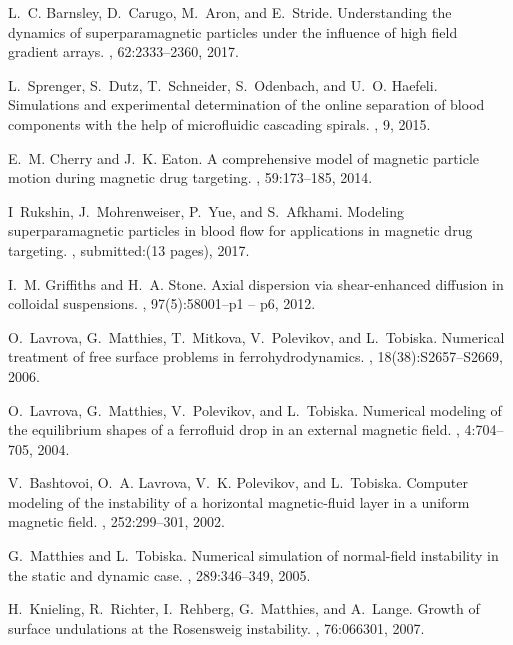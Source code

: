 \begin{thebibliography}{10}
L.~C. Barnsley, D.~Carugo, M.~Aron, and E.~Stride.
\newblock Understanding the dynamics of superparamagnetic particles under the
  influence of high field gradient arrays.
, 62:2333--2360, 2017.

L.~Sprenger, S.~Dutz, T.~Schneider, S.~Odenbach, and U.~O. Haefeli.
\newblock Simulations and experimental determination of the online separation
  of blood components with the help of microfluidic cascading spirals.
, 9, 2015.

E.~M. Cherry and J.~K. Eaton.
\newblock A comprehensive model of magnetic particle motion during magnetic
  drug targeting.
, 59:173--185, 2014.

I~Rukshin, J.~Mohrenweiser, P.~Yue, and S.~Afkhami.
\newblock Modeling superparamagnetic particles in blood flow for applications
  in magnetic drug targeting.
, submitted:(13 pages), 2017.

I.~M. Griffiths and H.~A. Stone.
\newblock Axial dispersion via shear-enhanced diffusion in colloidal
  suspensions.
, 97(5):58001--p1 -- p6, 2012.

O.~Lavrova, G.~Matthies, T.~Mitkova, V.~Polevikov, and L.~Tobiska.
\newblock Numerical treatment of free surface problems in ferrohydrodynamics.
, 18(38):S2657--S2669, 2006.

O.~Lavrova, G.~Matthies, V.~Polevikov, and L.~Tobiska.
\newblock Numerical modeling of the equilibrium shapes of a ferrofluid drop in
  an external magnetic field.
, 4:704--705, 2004.

V.~Bashtovoi, O.~A. Lavrova, V.~K. Polevikov, and L.~Tobiska.
\newblock Computer modeling of the instability of a horizontal magnetic-fluid
  layer in a uniform magnetic field.
, 252:299--301, 2002.

G.~Matthies and L.~Tobiska.
\newblock Numerical simulation of normal-field instability in the static and
  dynamic case.
, 289:346--349, 2005.

H.~Knieling, R.~Richter, I.~Rehberg, G.~Matthies, and A.~Lange.
\newblock Growth of surface undulations at the {R}osensweig instability.
, 76:066301, 2007.


\end{thebibliography}
